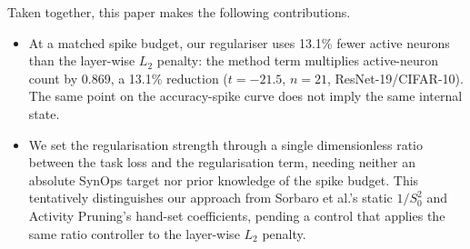 Taken together, this paper makes the following contributions.
\begin{itemize}\itemsep0pt
  \item At a matched spike budget, our regulariser uses 13.1\% fewer active neurons than
  the layer-wise $L_2$ penalty: the method term multiplies active-neuron count by 0.869,
  a 13.1\% reduction ($t=-21.5$, $n=21$, ResNet-19/CIFAR-10). The same point on the
  accuracy-spike curve does not imply the same internal state.
  \item We set the regularisation strength through a single dimensionless ratio between
  the task loss and the regularisation term, needing neither an absolute SynOps target
  nor prior knowledge of the spike budget. This tentatively distinguishes our approach
  from Sorbaro et al.'s static $1/S_0^2$ and Activity Pruning's hand-set coefficients,
  pending a control that applies the same ratio controller to the layer-wise $L_2$
  penalty.
\end{itemize}
